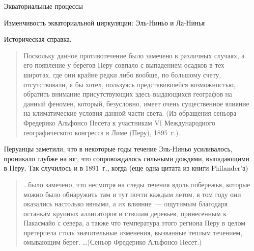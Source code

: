 \begin{chapter}{Экваториальные процессы}
\begin{section}{Изменчивость экваториальной циркуляции: Эль-Ниньо и Ла-Нинья}
\begin{paragraph}{Историческая справка.}
\begin{quotation}
Поскольку данное противотечение было замечено в различных случаях,
а его появление у берегов Перу совпало с выпадением осадков в тех широтах,
где они крайне редки либо вообще, по большому счету, отсутствовали, 
я бы хотел, пользуясь представившейся возможностью, обратить внимание 
присутствующих здесь выдающихся географов на данный феномен, который,
безусловно, имеет очень существенное влияние на климатические условия данной
части света. (Из обращения сеньора Фредерико Альфонсо Песета к участникам
VI Международного географического конгресса в Лиме (Перу), 1895~г.).
%
\end{quotation}

Перуанцы заметили, что в некоторые годы течение Эль-Ниньо усиливалось,
проникало глубже на юг, что сопровождалось сильными дождями, выпадающими 
в Перу. Так случилось и в 1891~г., когда (еще одна цитата из книги
Philander'а)
%
\begin{quotation}
\ldots было замечено, что несмотря на следы течения вдоль побережья, которые
можно было обнаружить там и тут почти каждым летом, в том году они оказались
настолько явными, а их влияние~--- ощутимым благодаря останкам крупных
аллигаторов и стволам деревьев, принесенным к Пакасмайо с севера, 
а также что температура этого региона Перу в целом претерпела столь 
значительные изменения, вызванные теплым течением, омывающим берег.
\ldots (Сеньор Фредерико Альфонсо Песет.)
%


\end{quotation}
\end{paragraph}
\end{section}
\end{chapter}
